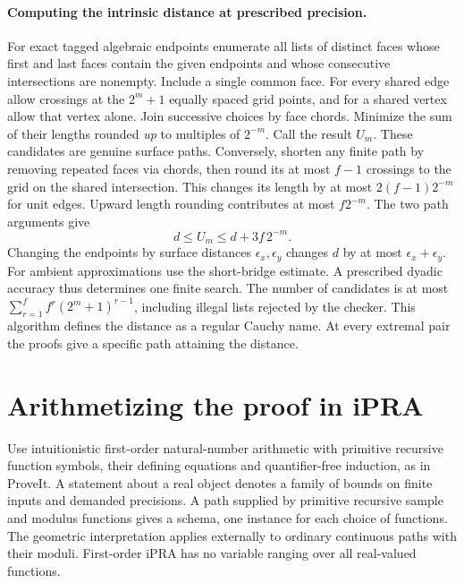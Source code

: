 \paragraph{Computing the intrinsic distance at prescribed precision.}
For exact tagged algebraic endpoints enumerate all lists of distinct faces whose first and last faces contain the given endpoints and whose consecutive intersections are nonempty. Include a single common face. For every shared edge allow crossings at the $2^m+1$ equally spaced grid points, and for a shared vertex allow that vertex alone. Join successive choices by face chords. Minimize the sum of their lengths rounded \emph{up} to multiples of $2^{-m}$. Call the result $U_m$. These candidates are genuine surface paths. Conversely, shorten any finite path by removing repeated faces via chords, then round its at most $f-1$ crossings to the grid on the shared intersection. This changes its length by at most $2(f-1)2^{-m}$ for unit edges. Upward length rounding contributes at most $f2^{-m}$. The two path arguments give
\[
 d\le U_m\le d+3f\,2^{-m}.
\]
Changing the endpoints by surface distances $\epsilon_x,\epsilon_y$ changes $d$ by at most $\epsilon_x+\epsilon_y$. For ambient approximations use the short-bridge estimate. A prescribed dyadic accuracy thus determines one finite search. The number of candidates is at most $\sum_{r=1}^f f^r(2^m+1)^{r-1}$, including illegal lists rejected by the checker. This algorithm defines the distance as a regular Cauchy name. At every extremal pair the proofs give a specific path attaining the distance.

\section{Arithmetizing the proof in iPRA}
Use intuitionistic first-order natural-number arithmetic with primitive recursive function symbols, their defining equations and quantifier-free induction, as in ProveIt. A statement about a real object denotes a family of bounds on finite inputs and demanded precisions. A path supplied by primitive recursive sample and modulus functions gives a schema, one instance for each choice of functions. The geometric interpretation applies externally to ordinary continuous paths with their moduli. First-order iPRA has no variable ranging over all real-valued functions.

